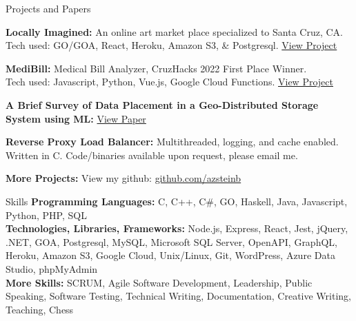 \documentclass{resume} %
\begin{document}
\begin{rSection}{Projects and Papers}
    
    {\bf{Locally Imagined:}} An online art market place specialized to Santa Cruz, CA.
    \\ Tech used: GO/GOA, React, Heroku, Amazon S3, \& Postgresql. \href{https://github.com/locally-imagined}{View Project}
    
    {\bf{MediBill:}} Medical Bill Analyzer, CruzHacks 2022 First Place Winner.
    \\Tech used: Javascript, Python, Vue.js, Google Cloud Functions. \href{https://devpost.com/software/health-hacker-7soucr}{View Project}
    
    {\bf{A Brief Survey of Data Placement in a Geo-Distributed Storage System using ML}: } \href{https://docs.google.com/document/u/1/d/e/2PACX-1vRi_JSl3urSJMr-Mj7rZGkyrPzMANauaqdgXekPwFfHyUSlrkR0azLyoCxT_S0u2tvndypQ5d6vsJwy/pub}{View Paper}
    
    {\bf{Reverse Proxy Load Balancer:} } Multithreaded, logging, and cache enabled. Written in C. Code/binaries available upon request, please email me.
    
    {\bf{More Projects:} } View my github: \href{https://github.com/azsteinb}{github.com/azsteinb}
\end{rSection}

\begin{rSection}{Skills}
    {\bf{Programming Languages:} } C, C++, C\#, GO, Haskell, Java, Javascript, Python, PHP, SQL
    \\{\bf{Technologies, Libraries, Frameworks:} } Node.js, Express, React, Jest, jQuery, .NET, GOA, Postgresql, MySQL, Microsoft SQL Server, OpenAPI, GraphQL, Heroku, Amazon S3, Google Cloud, Unix/Linux, Git, WordPress, Azure Data Studio, phpMyAdmin
    \\{\bf{More Skills:} } SCRUM, Agile Software Development, Leadership, Public Speaking, Software Testing, Technical Writing, Documentation, Creative Writing, Teaching, Chess
\end{rSection}
    
\end{document}
